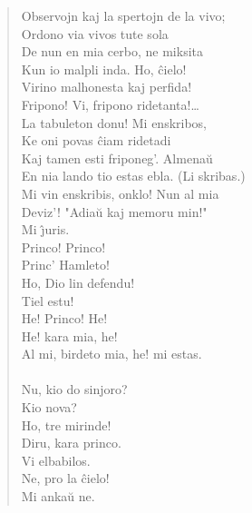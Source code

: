 \begin{verse}
                Observojn kaj la spertojn de la vivo;\\
                Ordono via vivos tute sola\\
                De nun en mia cerbo, ne miksita\\
                Kun io malpli inda. Ho, \^cielo!\\
                Virino malhonesta kaj perfida!\\
                Fripono! Vi, fripono ridetanta!\dots\\
                La tabuleton donu! Mi enskribos,\\
                Ke oni povas \^ciam ridetadi\\
                Kaj tamen esti friponeg'. Almena\u u\\
                En nia lando tio estas ebla. {\footnotesize (Li skribas.)}\\
                Mi vin enskribis, onklo! Nun al mia\\
                Deviz'! "Adia\u u kaj memoru min!"\\
                Mi \^{\j}uris.\\
Princo! Princo!\\
 Princ' Hamleto!\\
Ho, Dio lin defendu!\\
 Tiel estu!\\
He! Princo! He!\\
 He! kara mia, he!\\
                Al mi, birdeto mia, he! mi estas.\\
\\
 Nu, kio do sinjoro?\\
 Kio nova?\\
 Ho, tre mirinde!\\
 Diru, kara princo.\\
 Vi elbabilos.\\
  Ne, pro la \^cielo!\\
 Mi anka\u u ne.\\

\end{verse}
